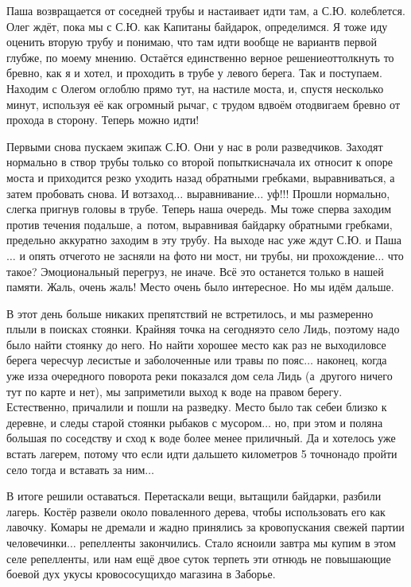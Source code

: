 Паша возвращается от соседней трубы и настаивает идти там, а С.Ю. колеблется. Олег ждёт, пока мы с С.Ю. как Капитаны байдарок, определимся. Я тоже иду оценить вторую трубу и понимаю, что там идти вообще не вариант\mdash в первой глубже, по моему мнению. Остаётся единственно верное решение\mdash оттолкнуть то бревно, как я и хотел, и проходить в трубе у левого берега. Так и поступаем. Находим с Олегом оглоблю прямо тут, на настиле моста, и, спустя несколько минут, используя её как огромный рычаг, с трудом вдвоём отодвигаем бревно от прохода в сторону. Теперь можно идти! 

Первыми снова пускаем экипаж С.Ю. Они у нас в роли разведчиков. Заходят нормально в створ трубы только со второй попытки\mdash сначала их относит к опоре моста и приходится резко уходить назад обратными гребками, выравниваться, а затем пробовать снова. И вот\mdash заход$\ldots$ выравнивание$\ldots$ уф!!! Прошли нормально, слегка пригнув головы в трубе. Теперь наша очередь. Мы тоже сперва заходим против течения подальше, а~потом, выравнивая байдарку обратными гребками, предельно аккуратно заходим в эту трубу. На выходе нас уже ждут С.Ю. и Паша$\ldots$ и опять отчего\sdash то не засняли на фото ни мост, ни трубы, ни прохождение$\ldots$ что такое? Эмоциональный перегруз, не иначе. Всё это останется только в нашей памяти. Жаль, очень жаль! Место очень было интересное. Но мы идём дальше.

В этот день больше никаких препятствий не встретилось, и мы размеренно плыли в поисках стоянки. Крайняя точка на сегодня\mdash это село Лидь, поэтому надо было найти стоянку до него. Но найти хорошее место как раз не выходило\mdash все берега чересчур лесистые и заболоченные или травы по пояс$\ldots$ наконец, когда уже из\sdash за очередного поворота реки показался дом села Лидь (а~другого ничего тут по карте и нет), мы заприметили выход к воде на правом берегу. Естественно, причалили и пошли на разведку. Место было так себе\mdash и близко к деревне, и следы старой стоянки рыбаков с мусором$\ldots$ но, при этом и поляна большая по соседству и сход к воде более менее приличный. Да и хотелось уже встать лагерем, потому что если идти дальше\mdash то километров 5 точно\mdash надо пройти село тогда и вставать за ним$\ldots$

В итоге решили оставаться. Перетаскали вещи, вытащили байдарки, разбили лагерь. Костёр развели около поваленного дерева, чтобы использовать его как лавочку. Комары не дремали и жадно принялись за кровопускания свежей партии человечинки$\ldots$ репелленты закончились. Стало ясно\mdash или завтра мы купим в этом селе репелленты, или нам ещё двое суток терпеть эти отнюдь не повышающие боевой дух укусы кровососущих\mdash до магазина в Заборье.

